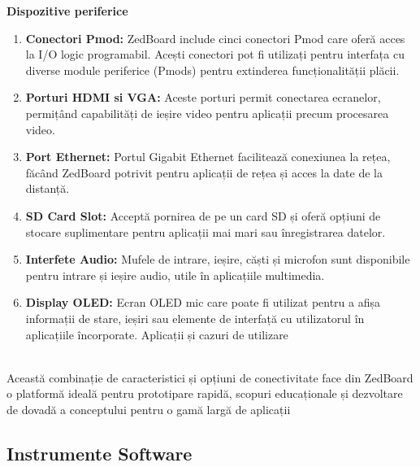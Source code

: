\documentclass[12pt]{article}
\begin{document}
\noindent \textbf{Dispozitive periferice}
\begin{enumerate}
    \item \textbf{Conectori Pmod:} ZedBoard include cinci conectori Pmod care oferă acces la I/O logic programabil. Acești conectori pot fi utilizați pentru interfața cu diverse module periferice (Pmods) pentru extinderea funcționalității plăcii.
    \item \textbf{Porturi HDMI si VGA:} Aceste porturi permit conectarea ecranelor, permițând capabilități de ieșire video pentru aplicații precum procesarea video.
    \item \textbf{Port Ethernet:} Portul Gigabit Ethernet facilitează conexiunea la rețea, făcând ZedBoard potrivit pentru aplicații de rețea și acces la date de la distanță.
    \item \textbf{SD Card Slot:} Acceptă pornirea de pe un card SD și oferă opțiuni de stocare suplimentare pentru aplicații mai mari sau înregistrarea datelor.
    \item \textbf{Interfete Audio:} Mufele de intrare, ieșire, căști și microfon sunt disponibile pentru intrare și ieșire audio, utile în aplicațiile multimedia.
    \item \textbf{Display OLED:} Ecran OLED mic care poate fi utilizat pentru a afișa informații de stare, ieșiri sau elemente de interfață cu utilizatorul în aplicațiile încorporate.
Aplicații și cazuri de utilizare\\\\
\end{enumerate}
\hspace*{1cm}Această combinație de caracteristici și opțiuni de conectivitate face din ZedBoard o platformă ideală pentru prototipare rapidă, scopuri educaționale și dezvoltare de dovadă a conceptului pentru o gamă largă de aplicații



\subsection{Instrumente Software}
\end{document}
